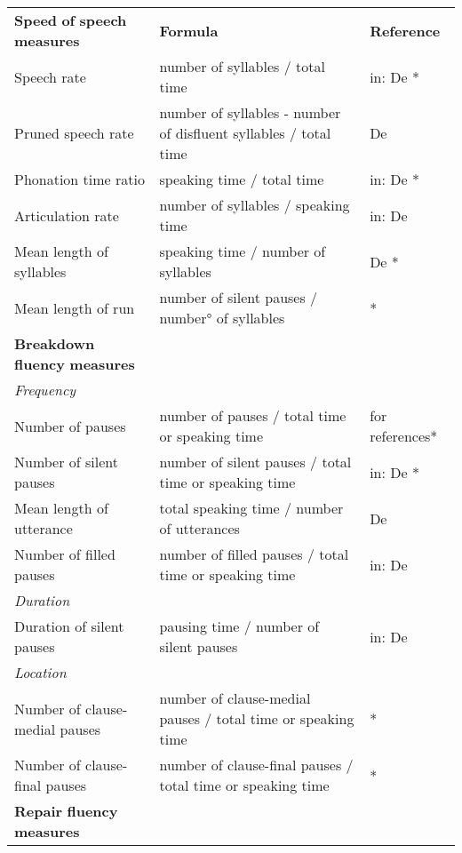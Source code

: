 \begin{tabularx}{\textwidth}{XXX}

\lsptoprule

\textbf{Speed} \textbf{of} \textbf{speech} \textbf{measures} & \textbf{Formula}  & \textbf{Reference}\\
Speech rate & number of syllables / total time & \citet{Kormos2006} in: De \citet{Jong2016}*\\
Pruned speech rate & number of syllables - number of disfluent syllables / total time & De \citet{Jong2016}\\
Phonation time ratio & speaking time / total time & \citet{Kormos2006} in: De \citet{Jong2016}*\\
Articulation rate & number of syllables / speaking time & \citet{Kormos2006} in: De \citet{Jong2016}\\
Mean length of syllables & speaking time / number of syllables & De \citet{Jong2016}*\\
Mean length of run & number of silent pauses / number° of syllables & \citet{Kormos2006}*\\
\textbf{Breakdown} \textbf{fluency} \textbf{measures} & ~ & ~\\
\textit{Frequency} & ~ & ~\\
Number of pauses & number of pauses / total time or speaking time & \citet{SaitoEtAl2018} for references*\\
Number of silent pauses & number of silent pauses / total time or speaking time & \citet{Kormos2006} in: De \citet{Jong2016}*\\
Mean length of utterance & total speaking time / number of utterances & De \citet{Jong2016}\\
Number of filled pauses & number of filled pauses / total time or speaking time & \citet{Kormos2006} in: De \citet{Jong2016}\\
\textit{Duration} & ~ & ~\\
Duration of silent pauses & pausing time / number of silent pauses & \citet{Kormos2006} in: De \citet{Jong2016}\\
\textit{Location} & ~ & ~\\
Number of clause-medial pauses & number of clause-medial pauses / total time or speaking time & \citet{SaitoEtAl2018}*\\
Number of clause-final pauses & number of clause-final pauses / total time or speaking time & \citet{SaitoEtAl2018}*\\
\textbf{Repair} \textbf{fluency} \textbf{measures} & ~ & ~\\

\end{tabularx}
